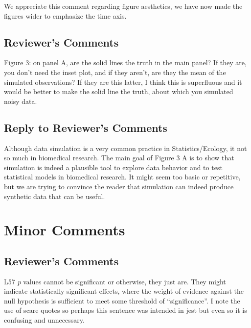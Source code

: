 \documentclass[
]{article}
\begin{document}
We appreciate this comment regarding figure aesthetics, we have now made the figures wider to emphasize the time axis.

\hypertarget{reviewers-comments-14}{%
\subsection{Reviewer's Comments}\label{reviewers-comments-14}}

Figure 3: on panel A, are the solid lines the truth in the main panel? If they are, you don't need the inset plot, and if they aren't, are they the mean of the simulated observations? If they are this latter, I think this is superfluous and it would be better to make the solid line the truth, about which you simulated noisy data.

\hypertarget{section-15}{%
\subsection{\texorpdfstring{\textcolor{reviewersblue} {Reply to Reviewer's Comments}}{}}\label{section-15}}

Although data simulation is a very common practice in Statistics/Ecology, it not so much in biomedical research. The main goal of Figure 3 A is to show that simulation is indeed a plausible tool to explore data behavior and to test statistical models in biomedical research. It might seem too basic or repetitive, but we are trying to convince the reader that simulation can indeed produce synthetic data that can be useful.

\hypertarget{minor-comments}{%
\section{Minor Comments}\label{minor-comments}}

\hypertarget{reviewers-comments-15}{%
\subsection{Reviewer's Comments}\label{reviewers-comments-15}}

L57 \emph{p} values cannot be significant or otherwise, they just are. They might indicate statistically significant effects, where the weight of evidence against the null hypothesis is sufficient to meet some threshold of ``significance''. I note the use of scare quotes so perhaps this sentence was intended in jest but even
so it is confusing and unnecessary.
\end{document}
